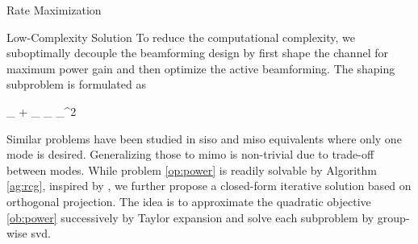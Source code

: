 \documentclass[journal]{IEEEtran}
\begin{document}
\begin{section}{Rate Maximization}
	\begin{subsection}{Low-Complexity Solution}
		\label{sc:rate_lc}
		To reduce the computational complexity, we suboptimally decouple the beamforming design by first shape the channel for maximum power gain and then optimize the active beamforming.
		The shaping subproblem is formulated as
		\begin{maxi!}
			{\scriptstyle{\mathbf{\Theta}}}{\lVert {}_ + _ \mathbf{\Theta} _ \rVert _^2}{\label{op:power}}{\label{ob:power}}
		\end{maxi!}
		Similar problems have been studied in \gls{siso} \cite{Shen2020a} and \gls{miso} equivalents \cite{Santamaria2023,Fang2023,Nerini2023,Nerini2023b} where only one mode is desired.
		Generalizing those to \gls{mimo} is non-trivial due to trade-off between modes.
		While problem \eqref{op:power} is readily solvable by Algorithm \ref{ag:rcg}, inspired by \cite{Nie2017}, we further propose a closed-form iterative solution based on orthogonal projection.
		The idea is to approximate the quadratic objective \eqref{ob:power} successively by Taylor expansion and solve each subproblem by group-wise \gls{svd}.


\end{subsection}
\end{section}
\end{document}
